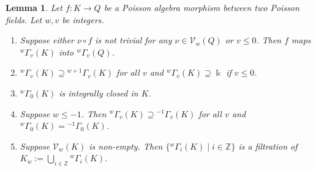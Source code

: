 \documentclass[12pt]{amsart}
\theoremstyle{plain}
\newtheorem{lemma}[theorem]{Lemma}
\numberwithin{theorem}{section}
\numberwithin{equation}{theorem}
\theoremstyle{definition}
\newcommand{\ZZ}{\mathbb{Z}}
\begin{document}
\begin{lemma}
\label{zzlem3.7}
Let $f: K\to Q$ be a Poisson algebra morphism between two 
Poisson fields. Let $w,v$ be integers.
\begin{enumerate}
\item[(1)]
Suppose either $\nu \circ f$ is not trivial for any
$\nu\in {\mathcal V}_w(Q)$ 
or $v \le 0$. Then $f$ maps ${^{w}\Gamma_{v}}(K)$ into ${^{w}\Gamma_{v}}(Q)$.
\item[(2)]
${^{w}\Gamma_{v}}(K)\supseteq {^{w+1}\Gamma_{v}}(K)$ for all 
$v$ and ${^{w}\Gamma_{v}}(K)\supseteq \Bbbk$ if $v\leq 0$.
\item[(3)]
${^{w}\Gamma_{0}}(K)$ is integrally closed in $K$.
\item[(4)]
Suppose $w\le -1$. Then ${^{w}\Gamma_{v}}(K)\supseteq 
{^{-1}\Gamma_{v}}(K)$ for all $v$ and 
${^{w}\Gamma_{0}}(K)={^{-1}\Gamma_{0}}(K)$. 
\item[(5)]
Suppose ${\mathcal V}_w(K)$ is non-empty. Then 
$\{{^{w}\Gamma_{i}}(K)\mid i\in {\ZZ}\}$ is a filtration 
of $K_{w}:=\bigcup_{i\in {\ZZ}} {^{w}\Gamma_{i}}(K)$.
\end{enumerate}
\end{lemma}
\end{document}
